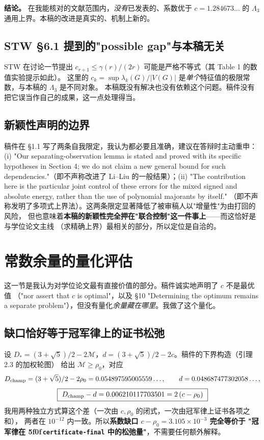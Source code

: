 \documentclass[UTF8,11pt]{ctexart}
\theoremstyle{definition}
\newcommand{\peq}[1]{\textup{\u5f0f}\,\texttt{#1}}
\begin{document}
\textbf{结论。} 在我能核对的文献范围内，\emph{没有}已发表的、系数优于 $c=1.284673\ldots$ 的
$\Lambda_3$ 通用上界。本稿的改进是真实的、机制上新的。

\subsection{STW \S6.1 提到的"possible gap"与本稿无关}

STW 在讨论一节提出 $c_{r+1}\le\gamma(r)/(2r)$ 可能是严格不等式（其 Table 1 的数值实验提示如此）。
这里的 $c_k=\sup\lambda_k(G)/|V(G)|$ 是\emph{单个}特征值的极限常数，与本稿的 $\Lambda_3$ 是不同对象。
本稿既没有解决也没有依赖这个问题。稿件没有把它误当作自己的成果，这一点处理得当。

\subsection{新颖性声明的边界}

稿件在 \S1.1 写了两条自我限定，我认为都必要且准确，建议在答辩时主动重申：
(i) "Our separating-observation lemma is stated and proved with its specific hypotheses in
Section 4; we do not claim a new general bound for such dependencies."（即不声称改进了
Li--Liu 的一般结果）；(ii) "The contribution here is the particular joint control of these errors
for the mixed signed and absolute energy, rather than the use of polynomial majorants by itself."
（即不声称发明了多项式上界法）。这两条限定显著降低了被审稿人以"增量性"为由打回的风险，
但也意味着\textbf{本稿的新颖性完全押在"联合控制"这一件事上}——而这恰好是与学位论文主线
（求精确上界）最相关的部分，所以定位是自洽的。

\section{常数余量的量化评估}\label{sec:slack}

这一节是我认为对学位论文最有直接价值的部分。稿件诚实地声明了 $c$ 不是最优值
（"nor assert that $c$ is optimal"，以及 \S10 "Determining the optimum remains a separate
problem"），但没有量化\emph{余量藏在哪里}。我做了这个量化。

\subsection{缺口恰好等于冠军律上的证书松弛}

设 $D_*=(3+\sqrt5)/2-2\mathcal M$，$d=(3+\sqrt5)/2-2c$。稿件的下界构造（引理 2.3 的加权轮图）
给出 $\mathcal M\ge\rho_0$，对应
\[
 D_{\rm champ}=(3+\sqrt5)/2-2\rho_0=0.054897595005559\ldots ,\qquad
 d=0.048687477302058\ldots ,
\]
\[
 \boxed{\ D_{\rm champ}-d=0.006210117703501=2\,(c-\rho_0)\ }
\]
我用两种独立方式算这个差（一次由 $c,\rho_0$ 的闭式，一次由冠军律上证书各项之和），
两者在 $10^{-12}$ 内一致。所以\textbf{系数缺口 $c-\rho_0=3.105\times10^{-3}$ 完全等价于
"冠军律在 \peq{certificate-final} 中的松弛量"}，不需要任何额外解释。
\end{document}
